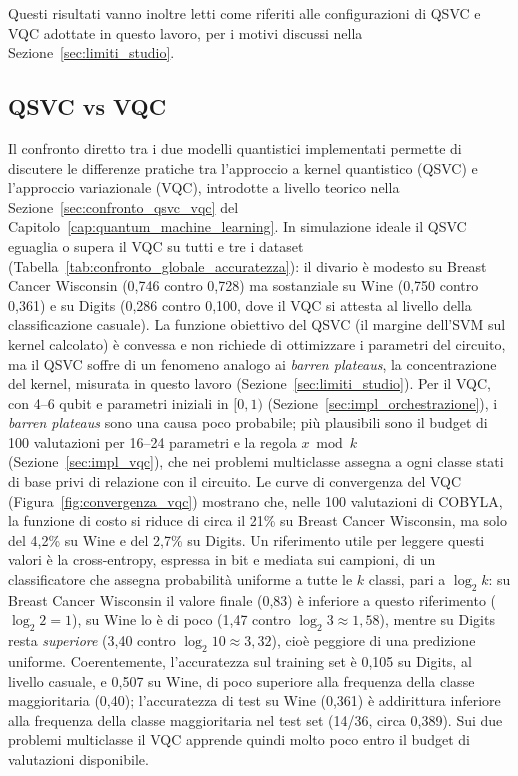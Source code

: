 Questi risultati vanno inoltre letti come riferiti alle configurazioni di QSVC e VQC adottate in questo lavoro, per i motivi discussi nella Sezione~\ref{sec:limiti_studio}.

\subsection{QSVC vs VQC}
Il confronto diretto tra i due modelli quantistici implementati permette di discutere le differenze pratiche tra l'approccio a kernel quantistico (QSVC) e l'approccio variazionale (VQC), introdotte a livello teorico nella Sezione~\ref{sec:confronto_qsvc_vqc} del Capitolo~\ref{cap:quantum_machine_learning}. In simulazione ideale il QSVC eguaglia o supera il VQC su tutti e tre i dataset (Tabella~\ref{tab:confronto_globale_accuratezza}): il divario è modesto su Breast Cancer Wisconsin (0,746 contro 0,728) ma sostanziale su Wine (0,750 contro 0,361) e su Digits (0,286 contro 0,100, dove il VQC si attesta al livello della classificazione casuale). La funzione obiettivo del QSVC (il margine dell'SVM sul kernel calcolato) è convessa e non richiede di ottimizzare i parametri del circuito, ma il QSVC soffre di un fenomeno analogo ai \textit{barren plateaus}, la concentrazione del kernel, misurata in questo lavoro (Sezione~\ref{sec:limiti_studio}). Per il VQC, con 4--6 qubit e parametri iniziali in $[0,1)$ (Sezione~\ref{sec:impl_orchestrazione}), i \textit{barren plateaus} sono una causa poco probabile; più plausibili sono il budget di 100 valutazioni per 16--24 parametri e la regola $x \bmod k$ (Sezione~\ref{sec:impl_vqc}), che nei problemi multiclasse assegna a ogni classe stati di base privi di relazione con il circuito. Le curve di convergenza del VQC (Figura~\ref{fig:convergenza_vqc}) mostrano che, nelle 100 valutazioni di COBYLA, la funzione di costo si riduce di circa il 21\% su Breast Cancer Wisconsin, ma solo del 4,2\% su Wine e del 2,7\% su Digits. Un riferimento utile per leggere questi valori è la cross-entropy, espressa in bit e mediata sui campioni, di un classificatore che assegna probabilità uniforme a tutte le $k$ classi, pari a $\log_2 k$: su Breast Cancer Wisconsin il valore finale (0,83) è inferiore a questo riferimento ($\log_2 2 = 1$), su Wine lo è di poco (1,47 contro $\log_2 3 \approx 1,58$), mentre su Digits resta \emph{superiore} (3,40 contro $\log_2 10 \approx 3,32$), cioè peggiore di una predizione uniforme. Coerentemente, l'accuratezza sul training set è 0,105 su Digits, al livello casuale, e 0,507 su Wine, di poco superiore alla frequenza della classe maggioritaria (0,40); l'accuratezza di test su Wine (0,361) è addirittura inferiore alla frequenza della classe maggioritaria nel test set (14/36, circa 0,389). Sui due problemi multiclasse il VQC apprende quindi molto poco entro il budget di valutazioni disponibile.

